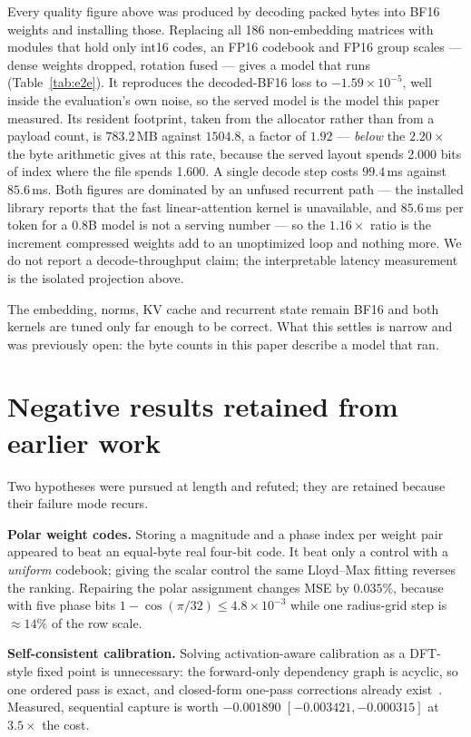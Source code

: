 \documentclass[11pt]{article}
\begin{document}
Every quality figure above was produced by decoding packed bytes into BF16
weights and installing those. Replacing all 186 non-embedding matrices with
modules that hold only int16 codes, an FP16 codebook and FP16 group scales ---
dense weights dropped, rotation fused --- gives a model that runs
(Table~\ref{tab:e2e}). It reproduces the decoded-BF16 loss to
$-1.59\times10^{-5}$, well inside the evaluation's own noise, so the served
model is the model this paper measured. Its resident footprint, taken from the
allocator rather than from a payload count, is $783.2$\,MB against $1504.8$, a
factor of $1.92$ --- \emph{below} the $2.20\times$ the byte arithmetic gives at
this rate, because the served layout spends 2.000 bits of index where the file
spends 1.600. A single decode step costs $99.4$\,ms against $85.6$\,ms. Both
figures are dominated by an unfused recurrent path --- the installed library
reports that the fast linear-attention kernel is unavailable, and $85.6$\,ms per
token for a 0.8B model is not a serving number --- so the $1.16\times$ ratio is
the increment compressed weights add to an unoptimized loop and nothing more. We
do not report a decode-throughput claim; the interpretable latency measurement
is the isolated projection above.



The embedding, norms, KV cache and recurrent state remain BF16 and both kernels
are tuned only far enough to be correct. What this settles is narrow and was
previously open: the byte counts in this paper describe a model that ran.

\section{Negative results retained from earlier work}

Two hypotheses were pursued at length and refuted; they are retained because
their failure mode recurs.

\textbf{Polar weight codes.} Storing a magnitude and a phase index per weight
pair appeared to beat an equal-byte real four-bit code. It beat only a control
with a \emph{uniform} codebook; giving the scalar control the same Lloyd--Max
fitting reverses the ranking. Repairing the polar assignment changes MSE by
$0.035\%$, because with five phase bits $1-\cos(\pi/32) \le 4.8\times10^{-3}$
while one radius-grid step is $\approx 14\%$ of the row scale.

\textbf{Self-consistent calibration.} Solving activation-aware calibration as a
DFT-style fixed point is unnecessary: the forward-only dependency graph is
acyclic, so one ordered pass is exact, and closed-form one-pass corrections
already exist~\cite{gptaq}. Measured, sequential capture is worth $-0.001890$
$[-0.003421,-0.000315]$ at $3.5\times$ the cost.
\end{document}

